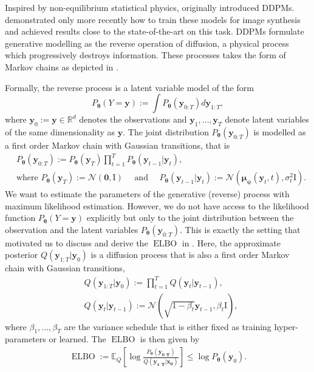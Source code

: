 Inspired by non-equilibrium statistical physics, \citet{sohl-dickstein_deep_2015} originally introduced DDPMs. \citet{ho_denoising_2020}  demonstrated only more recently how to train these models for image synthesis and achieved results close to the state-of-the-art on this task. DDPMs formulate generative modelling as the reverse operation of diffusion, a physical process which progressively destroys information. These processes takes the form of Markov chains as depicted in .

Formally, the reverse process is a latent variable model of the form
$$P_{\bm{\theta}}(Y=\mathbf{y}) := \int P_{\bm{\theta}}(\mathbf{y}_{0:T}) d\mathbf{y}_{1:T},$$
where $\mathbf{y}_0:=\mathbf{y} \in \mathbb{R}^d$ denotes the observations and $\mathbf{y}_1, \dots, \mathbf{y}_T$ denote latent variables of the same dimensionality as $\mathbf{y}$. The joint distribution $P_{\bm{\theta}}(\mathbf{y}_{0:T})$ is modelled as a first order Markov chain with Gaussian transitions, that is
\begin{align}
    &P_{\bm{\theta}}(\mathbf{y}_{0:T}) := P_{\bm{\theta}}(\mathbf{y}_{T}) \prod^T_{t=1} P_{\bm{\theta}}(\mathbf{y}_{t-1}|\mathbf{y}_{t}),\\
    & \text{where } P_{\bm{\theta}}(\mathbf{y}_{T}) := \mathcal{N}(\mathbf{0}, \text{I}) \quad \text{ and } \quad P_{\bm{\theta}}(\mathbf{y}_{t-1}|\mathbf{y}_{t}) := \mathcal{N}(\mathbf{\mu_\psi}(\mathbf{y}_t, t), \sigma_t^2 \text{I}).
\end{align}
We want to estimate the parameters of the generative (reverse) process with maximum likelihood estimation. However, we do not have access to the likelihood function $P_{\bm{\theta}}(Y=\mathbf{y})$ explicitly but only to the joint distribution between the observation and the latent variables $P_{\bm{\theta}}(\mathbf{y}_{0:T})$. This is exactly the setting that motivated us to discuss and derive the $\operatorname{ELBO}$ in .
Here, the approximate posterior $Q(\mathbf{y}_{1:T}|\mathbf{y}_0)$ is a diffusion process that is also a first order Markov chain with Gaussian transitions,
\begin{align}
    &Q(\mathbf{y}_{1:T}|\mathbf{y}_0) := \prod^T_{t=1} Q(\mathbf{y}_{t}|\mathbf{y}_{t-1}),\\
    &Q(\mathbf{y}_{t}|\mathbf{y}_{t-1}) := \mathcal{N}(\sqrt{1-\beta_t} \mathbf{y}_{t-1}, \beta_t \text{I}),
\end{align}
where $\beta_1, \hdots, \beta_T$ are the variance schedule that is either fixed as training hyper-parameters or learned.
The $\operatorname{ELBO}$ is then given by
\begin{align}
    \operatorname{ELBO} := \mathbb{E}_Q\left[ \log \frac{P_{\bm{\theta}}(\mathbf{y_{0:T}})}{Q(\mathbf{y_{1:T}}|\mathbf{x_0})} \right] \leq \log P_{\bm{\theta}}(\mathbf{y}_0). \label{eq:ELBO_DDPM}
\end{align}

